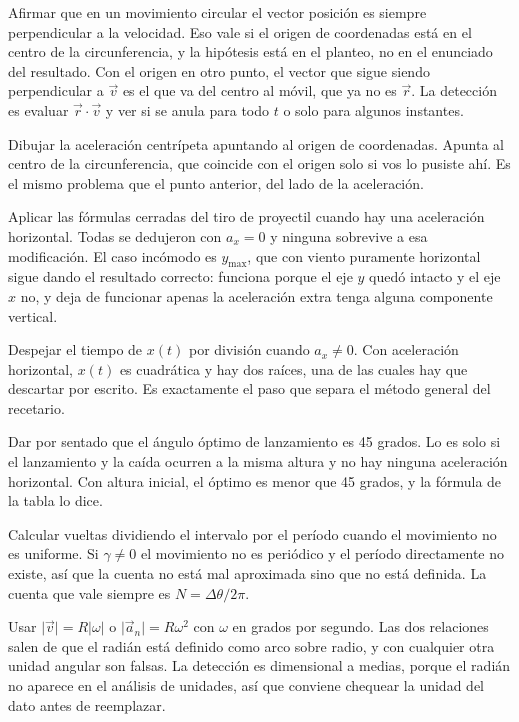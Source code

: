 \documentclass[11pt,openany]{book}
\begin{document}
\begin{erroresComunes}
  \item Afirmar que en un movimiento circular el vector posición es siempre perpendicular a la velocidad. Eso vale si el origen de coordenadas está en el centro de la circunferencia, y la hipótesis está en el planteo, no en el enunciado del resultado. Con el origen en otro punto, el vector que sigue siendo perpendicular a $\vec v$ es el que va del centro al móvil, que ya no es $\vec r$. La detección es evaluar $\vec r\cdot\vec v$ y ver si se anula para todo $t$ o solo para algunos instantes.
  \item Dibujar la aceleración centrípeta apuntando al origen de coordenadas. Apunta al centro de la circunferencia, que coincide con el origen solo si vos lo pusiste ahí. Es el mismo problema que el punto anterior, del lado de la aceleración.
  \item Aplicar las fórmulas cerradas del tiro de proyectil cuando hay una aceleración horizontal. Todas se dedujeron con $a_x = 0$ y ninguna sobrevive a esa modificación. El caso incómodo es $y_{\max}$, que con viento puramente horizontal sigue dando el resultado correcto: funciona porque el eje $y$ quedó intacto y el eje $x$ no, y deja de funcionar apenas la aceleración extra tenga alguna componente vertical.
  \item Despejar el tiempo de $x(t)$ por división cuando $a_x \neq 0$. Con aceleración horizontal, $x(t)$ es cuadrática y hay dos raíces, una de las cuales hay que descartar por escrito. Es exactamente el paso que separa el método general del recetario.
  \item Dar por sentado que el ángulo óptimo de lanzamiento es 45 grados. Lo es solo si el lanzamiento y la caída ocurren a la misma altura y no hay ninguna aceleración horizontal. Con altura inicial, el óptimo es menor que 45 grados, y la fórmula de la tabla lo dice.
  \item Calcular vueltas dividiendo el intervalo por el período cuando el movimiento no es uniforme. Si $\gamma \neq 0$ el movimiento no es periódico y el período directamente no existe, así que la cuenta no está mal aproximada sino que no está definida. La cuenta que vale siempre es $N = \Delta\theta/2\pi$.
  \item Usar $\lvert\vec v\rvert = R\lvert\omega\rvert$ o $\lvert\vec a_n\rvert = R\omega^2$ con $\omega$ en grados por segundo. Las dos relaciones salen de que el radián está definido como arco sobre radio, y con cualquier otra unidad angular son falsas. La detección es dimensional a medias, porque el radián no aparece en el análisis de unidades, así que conviene chequear la unidad del dato antes de reemplazar.

\end{erroresComunes}
\end{document}
